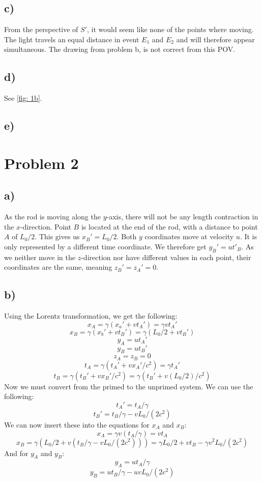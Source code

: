 \documentclass{article}
\begin{document}
\subsection*{c)}
From the perspective of $S'$, it would seem like none of the points where moving. The light travels an equal distance in event $E_1$ and $E_2$ and will therefore appear simultaneous. The drawing from problem b, is not correct from this POV. 

\subsection*{d)}
See \cref{fig: 1b}. 

\subsection*{e)}


\section*{Problem 2}
\subsection*{a)}
As the rod is moving along the $y$-axis, there will not be any length contraction in the $x$-direction. Point $B$ is located at the end of the rod, with a distance to point $A$ of $L_0 / 2$. This gives us $x_{B}' = L_0 / 2$. Both $y$ coordinates move at velocity $u$. It is only represented by a different time coordinate. We therefore get $y_{B}' = ut'_{B}$. As we neither move in the $z$-direction nor have different values in each point, their coordinates are the same, meaning $z_{B}' = z_{A}' = 0$. 

\subsection*{b)}
Using the Lorentz transformation, we get the following:
\[
x_{A} = γ(x_a' + vt_{A}') = γvt_{A}'
\]
\[
x_{B} = γ(x_b' + vt_{B}') = γ(L_0 / 2 + vt_{B}')
\]
\[
y_{A} = ut_{A}' 
\]
\[
y_{B} = ut_{B}'
\]
\[
z_{A} = z_{B} = 0
\]
\[
t_{A} = γ(t_{A}' + vx_{A}' / c^2) = γt_{A}'
\]
\[
t_{B} = γ(t_{B}' + vx_{B}' / c^2) = γ(t_{B}' + v(L_0 / 2) / c^2)
\]
Now we must convert from the primed to the unprimed system. We can use the following:
\[
t_{A}' = t_{A} / γ 
\]
\[
t_{B}' = t_{B} / γ - vL_0 / (2c^2)
\]
We can now insert these into the equations for $x_{A}$ and $x_{B}$:
\[
x_{A} = γv(t_{A} / γ) = vt_{A}
\]
\[
x_{B} = γ(L_0 / 2 + v(t_{B} / γ - vL_0 / (2c^2))) = γL_0 / 2 + vt_{B} - γv^2L_0 / (2c^2)
\]
And for $y_{A}$ and $y_{B}$:
\[
y_{A} = ut_{A} / γ
\]
\[
y_{B} = ut_{B} / γ - uvL_0 / (2c^2)
\]
\end{document}
